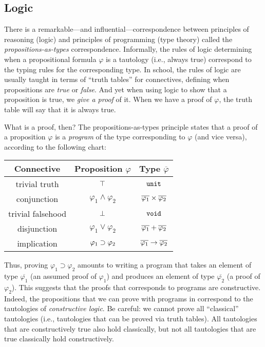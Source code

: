 \documentclass[11pt]{article}
\begin{document}
\subsection{Logic}

There is a remarkable---and influential---correspondence between principles of reasoning (logic) and principles of programming (type theory) called the \emph{propositions-as-types} correspondence.
Informally, the rules of logic determining when a propositional formula $\varphi$ is a tautology (i.e., always true) correspond to the typing rules for the corresponding type.
In school, the rules of logic are usually taught in terms of ``truth tables'' for connectives, defining when propositions are \emph{true} or \emph{false}.
And yet when using logic to show that a proposition is true, we \emph{give a proof} of it.
When we have a proof of $\varphi$, the truth table will say that it is always true.%

What is a proof, then?
The propositions-as-types principle states that a proof of a proposition $\varphi$ is a \emph{program} of the type corresponding to $\varphi$ (and vice versa), according to the following chart:
\begin{center}
  \begin{tabular}{c c c}
    Connective        & Proposition $\varphi$           & Type $\overline{\varphi}$ \\ \hline
    trivial truth     & $\top$                        & $\mathtt{unit}$ \\
    conjunction       & $\varphi_1 \land \varphi_2$     & ${\overline{\varphi_1}}\times{\overline{\varphi_2}}$ \\
    trivial falsehood & $\bot$                       & $\mathtt{void}$ \\
    disjunction       & $\varphi_1 \lor \varphi_2$      & ${\overline{\varphi_1}}\mathbin{+}{\overline{\varphi_2}}$ \\
    implication       & $\varphi_1 \supset \varphi_2$ & ${\overline{\varphi_1}}\mathrel{\to}{\overline{\varphi_2}}$
  \end{tabular}
\end{center}

Thus, proving $\varphi_1 \supset \varphi_2$ amounts to writing a program that takes an element of type $\overline{\varphi_1}$ (an assumed proof of $\varphi_1$) and produces an element of type $\overline{\varphi_2}$ (a proof of $\varphi_2$).
%
This suggests that the proofs that corresponds to programs are constructive.
%
Indeed, the propositions that we can prove with programs in \LangPSF{}
correspond to the tautologies of \emph{constructive logic}.
%
Be careful: we cannot prove all ``classical'' tautologies (i.e., tautologies that can be proved via truth tables).
All tautologies that are constructively true also hold classically, but not all tautologies that are true classically hold constructively.
\end{document}
